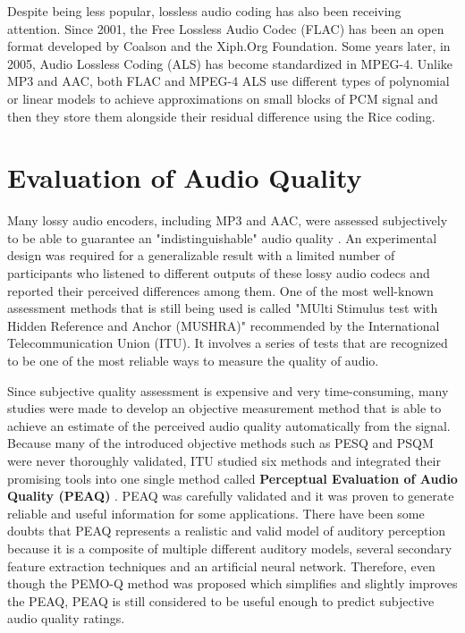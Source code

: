 Despite being less popular, lossless audio coding has also been receiving attention. Since 2001, the Free Lossless Audio Codec (FLAC) has been an open format developed by Coalson and the Xiph.Org Foundation. Some years later, in 2005, Audio Lossless Coding (ALS) has become standardized in MPEG-4. Unlike MP3 and AAC, both FLAC and MPEG-4 ALS use different types of polynomial or linear models to achieve approximations on small blocks of PCM signal and then they store them alongside their residual difference using the Rice coding\cite{coalson_2001_flac, liebchen_2005_ALC}.


\section{Evaluation of Audio Quality}

Many lossy audio encoders, including MP3 and AAC, were assessed subjectively to be able to guarantee an "indistinguishable" audio quality \cite{mpeg1-1993,mpeg4-2001}. An experimental design was required for a generalizable result with a limited number of participants who listened to different outputs of these lossy audio codecs and reported their perceived differences among them. One of the most well-known assessment methods that is still being used is called "MUlti Stimulus test with Hidden Reference and Anchor (MUSHRA)" recommended by the International Telecommunication Union (ITU)\cite{MUSHRA}. It involves a series of tests that are recognized to be one of the most reliable ways to measure the quality of audio.

Since subjective quality assessment is expensive and very time-consuming, many studies were made to develop an objective measurement method that is able to achieve an estimate of the perceived audio quality automatically from the signal. Because many of the introduced objective methods such as PESQ\cite{pesq} and PSQM\cite{psqm} were never thoroughly validated, ITU studied six methods and integrated their promising tools into one single method called \textbf{Perceptual Evaluation of Audio Quality (PEAQ)} \cite{peaq}. PEAQ was carefully validated and it was proven to generate reliable and useful information for some applications. There have been some doubts that PEAQ represents a realistic and valid model of auditory perception because it is a composite of multiple different auditory models, several secondary feature extraction techniques and an artificial neural network. Therefore, even though the PEMO-Q method was proposed which simplifies and slightly improves the PEAQ\cite{huber2006pemo}, PEAQ is still considered to be useful enough to predict subjective audio quality ratings.

